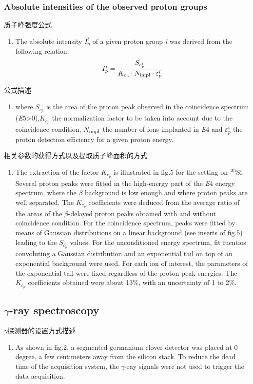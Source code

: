 \documentclass[a4paper]{article}
\begin{document}
\subsubsection{Absolute intensities of the observed proton groups}
质子峰强度公式
\begin{enumerate}
    \item The absolute intensity $I_{p}^{i}$ of a given proton group \textit{i} was derived from the following relation:
    \begin{equation}
        I_{p}^{i}=\frac{S_{c_{p}^{i}}}{K_{c_{p}} \cdot N_{\textnormal{impl}}\cdot \varepsilon_{p}^{i}}
    \end{equation}
\end{enumerate}

公式描述
\begin{enumerate}
    \item where $S_{c_{p}^{i}}$ is the area of the proton peak observed in the coincidence spectrum (\textit{E}5>0),$K_{c_{p}}$ the normalization factor to be taken into account due to the coincidence condition, $N_{\textnormal{impl}}$ the number of ions implanted in \textit{E}4 and $\varepsilon_{p}^{i}$ the proton detection efficiency for a given proton energy.
\end{enumerate}

相关参数的获得方式以及提取质子峰面积的方式
\begin{enumerate}
    \item The extraction of the factor $K_{c_{p}}$ is illustrated in fig.5 for the setting on $^{25}\textnormal{Si}$. Several proton peaks were fitted in the high-energy part of the \textit{E}4 energy spectrum, where the $\beta$ background is low enough and where proton peaks are well separated. The $K_{c_{p}}$ coefficients were deduced from the average ratio of the areas of the $\beta$-delayed proton peaks obtained with and without coincidence condition. For the coincidence spectrum, peaks were fitted by means of Gaussian distributions on a linear background (see inserts of fig.5) leading to the $S_{c_{p}^{i}}$ values. For the unconditioned energy spectrum, fit fucntios convoluting a Gaussian distribution and an exponential tail on top of an exponential background were used. For each ion of interest, the parameters of the exponential tail were fixed regardless of the proton peak energies. The $K_{c_{p}}$ coefficients obtained were about 13\%, with an uncertainty of 1 to 2\%.
\end{enumerate}


\subsection{$\gamma$-ray spectroscopy}
$\gamma$探测器的设置方式描述
\begin{enumerate}
    \item As shown in fig.2, a segmented germanium clover detector was placed at 0 degree, a few centimeters away from the silicon stack. To reduce the dead time of the acquisition system, the $\gamma$-ray signals were not used to trigger the data acquisition. 
\end{enumerate}
\end{document}
